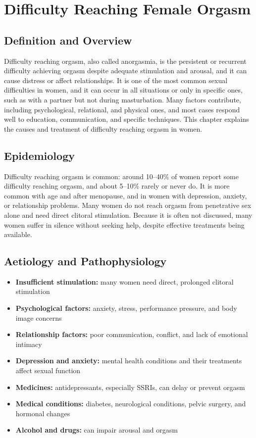 \chapter{Difficulty Reaching Female Orgasm}

\section*{Definition and Overview}
Difficulty reaching orgasm, also called anorgasmia, is the persistent or recurrent difficulty achieving orgasm despite adequate stimulation and arousal, and it can cause distress or affect relationships. It is one of the most common sexual difficulties in women, and it can occur in all situations or only in specific ones, such as with a partner but not during masturbation. Many factors contribute, including psychological, relational, and physical ones, and most cases respond well to education, communication, and specific techniques. This chapter explains the causes and treatment of difficulty reaching orgasm in women.

\section*{Epidemiology}
Difficulty reaching orgasm is common: around 10--40\% of women report some difficulty reaching orgasm, and about 5--10\% rarely or never do. It is more common with age and after menopause, and in women with depression, anxiety, or relationship problems. Many women do not reach orgasm from penetrative sex alone and need direct clitoral stimulation. Because it is often not discussed, many women suffer in silence without seeking help, despite effective treatments being available.

\section*{Aetiology and Pathophysiology}
\begin{itemize}
    \item \textbf{Insufficient stimulation:} many women need direct, prolonged clitoral stimulation
    \item \textbf{Psychological factors:} anxiety, stress, performance pressure, and body image concerns
    \item \textbf{Relationship factors:} poor communication, conflict, and lack of emotional intimacy
    \item \textbf{Depression and anxiety:} mental health conditions and their treatments affect sexual function
    \item \textbf{Medicines:} antidepressants, especially SSRIs, can delay or prevent orgasm
    \item \textbf{Medical conditions:} diabetes, neurological conditions, pelvic surgery, and hormonal changes
    \item \textbf{Alcohol and drugs:} can impair arousal and orgasm
\end{itemize}

